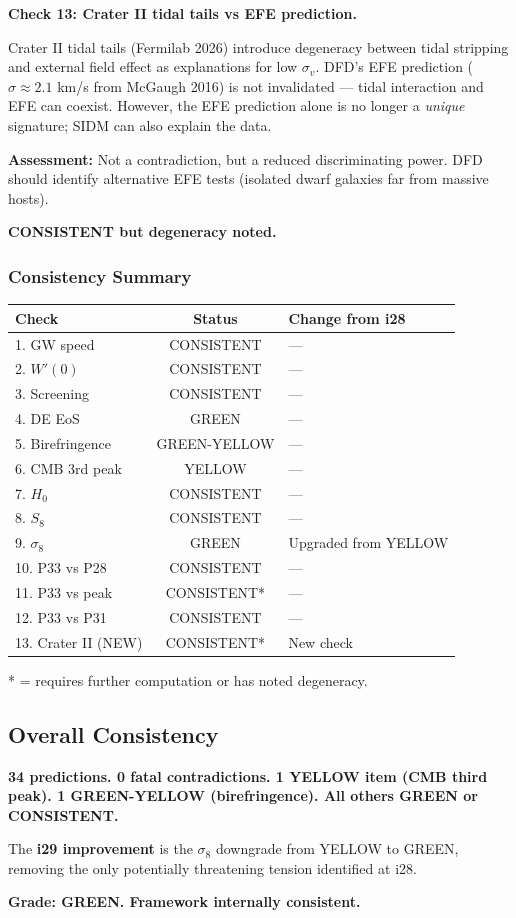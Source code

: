 \documentclass[11pt,a4paper]{article}
\begin{document}
\textbf{Check 13: Crater II tidal tails vs EFE prediction.}

Crater II tidal tails (Fermilab 2026) introduce degeneracy between tidal stripping and external field effect as explanations for low $\sigma_v$. DFD's EFE prediction ($\sigma \approx 2.1$ km/s from McGaugh 2016) is not invalidated --- tidal interaction and EFE can coexist. However, the EFE prediction alone is no longer a \emph{unique} signature; SIDM can also explain the data.

\textbf{Assessment:} Not a contradiction, but a reduced discriminating power. DFD should identify alternative EFE tests (isolated dwarf galaxies far from massive hosts).

\textbf{CONSISTENT but degeneracy noted.}

\subsubsection{Consistency Summary}

\begin{center}
\begin{tabular}{lcl}
\toprule
\textbf{Check} & \textbf{Status} & \textbf{Change from i28} \\
\midrule
1. GW speed & CONSISTENT & --- \\
2. $W'(0)$ & CONSISTENT & --- \\
3. Screening & CONSISTENT & --- \\
4. DE EoS & GREEN & --- \\
5. Birefringence & GREEN-YELLOW & --- \\
6. CMB 3rd peak & YELLOW & --- \\
7. $H_0$ & CONSISTENT & --- \\
8. $S_8$ & CONSISTENT & --- \\
9. $\sigma_8$ & GREEN & Upgraded from YELLOW \\
10. P33 vs P28 & CONSISTENT & --- \\
11. P33 vs peak & CONSISTENT* & --- \\
12. P33 vs P31 & CONSISTENT & --- \\
13. Crater II (NEW) & CONSISTENT* & New check \\
\bottomrule
\end{tabular}
\end{center}

* = requires further computation or has noted degeneracy.

\subsection{Overall Consistency}

\textbf{34 predictions. 0 fatal contradictions. 1 YELLOW item (CMB third peak). 1 GREEN-YELLOW (birefringence). All others GREEN or CONSISTENT.}

The \textbf{i29 improvement} is the $\sigma_8$ downgrade from YELLOW to GREEN, removing the only potentially threatening tension identified at i28.

\textbf{Grade: GREEN. Framework internally consistent.}
\end{document}
